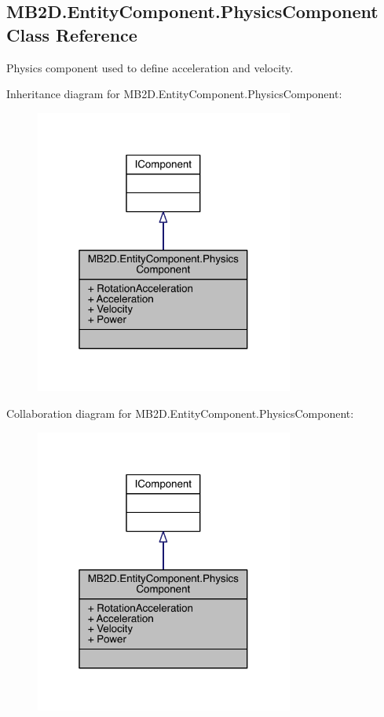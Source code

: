 \hypertarget{class_m_b2_d_1_1_entity_component_1_1_physics_component}{}\subsection{M\+B2\+D.\+Entity\+Component.\+Physics\+Component Class Reference}
\label{class_m_b2_d_1_1_entity_component_1_1_physics_component}


Physics component used to define acceleration and velocity.  




Inheritance diagram for M\+B2\+D.\+Entity\+Component.\+Physics\+Component\+:
\nopagebreak
\begin{figure}[H]
\begin{center}
\leavevmode
\includegraphics[width=241pt]{class_m_b2_d_1_1_entity_component_1_1_physics_component__inherit__graph}
\end{center}
\end{figure}


Collaboration diagram for M\+B2\+D.\+Entity\+Component.\+Physics\+Component\+:
\nopagebreak
\begin{figure}[H]
\begin{center}
\leavevmode
\includegraphics[width=241pt]{class_m_b2_d_1_1_entity_component_1_1_physics_component__coll__graph}
\end{center}
\end{figure}

